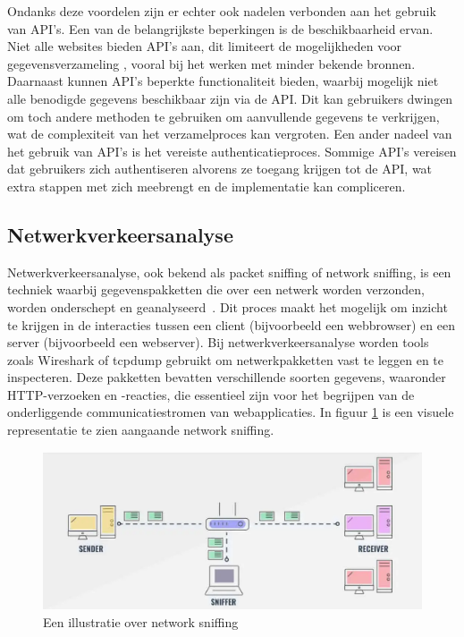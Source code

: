 Ondanks deze voordelen zijn er echter ook nadelen verbonden aan het gebruik van API's. Een van de belangrijkste beperkingen is de beschikbaarheid ervan. Niet alle websites bieden API's aan, dit limiteert de mogelijkheden voor gegevensverzameling , vooral bij het werken met minder bekende bronnen.
Daarnaast kunnen API's beperkte functionaliteit bieden, waarbij mogelijk niet alle benodigde gegevens beschikbaar zijn via de API. Dit kan gebruikers dwingen om toch andere methoden te gebruiken om aanvullende gegevens te verkrijgen, wat de complexiteit van het verzamelproces kan vergroten.
Een ander nadeel van het gebruik van API's is het vereiste authenticatieproces. Sommige API's vereisen dat gebruikers zich authentiseren alvorens ze toegang krijgen tot de API, wat extra stappen met zich meebrengt en de implementatie kan compliceren.

\subsection{Netwerkverkeersanalyse}
Netwerkverkeersanalyse, ook bekend als packet sniffing of network sniffing, is een techniek waarbij gegevenspakketten die over een netwerk worden verzonden, worden onderschept en geanalyseerd~\autocite{Chapple2018}. Dit proces maakt het mogelijk om inzicht te krijgen in de interacties tussen een client (bijvoorbeeld een webbrowser) en een server (bijvoorbeeld een webserver).
Bij netwerkverkeersanalyse worden tools zoals Wireshark of tcpdump gebruikt om netwerkpakketten vast te leggen en te inspecteren. Deze pakketten bevatten verschillende soorten gegevens, waaronder HTTP-verzoeken en -reacties, die essentieel zijn voor het begrijpen van de onderliggende communicatiestromen van webapplicaties. In figuur \ref{fig:networksniffing} is een visuele representatie te zien aangaande network sniffing.
\begin{figure}[h]
    \centering
    \includegraphics[width=\linewidth]{graphics/networksniffing.png}
    \caption{Een illustratie over network sniffing}
    \label{fig:networksniffing}
\end{figure}

